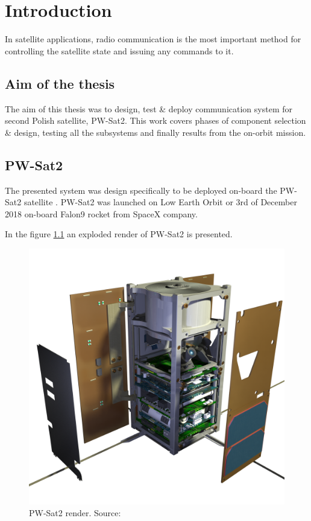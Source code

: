 \chapter{Introduction}
In satellite applications, radio communication is the most important method for controlling the satellite state and issuing any commands to it. 

\section{Aim of the thesis}
The aim of this thesis was to design, test \& deploy communication system for second Polish satellite, PW-Sat2. This work covers phases of component selection \& design, testing all the subsystems and finally results from the on-orbit mission.

\section{PW-Sat2}
    The presented system was design specifically to be deployed on-board the PW-Sat2 satellite \cite{PW-Sat2URL}. PW-Sat2 was launched on Low Earth Orbit or 3rd of December 2018 on-board Falon9 rocket from SpaceX company.

    In the figure \ref{PW-Sat_render_01} an exploded render of PW-Sat2 is presented.
    

    \begin{figure}[H]
        \centering
        \includegraphics[width=0.65\paperwidth]{img/1/PW-Sat2_render_01.png}
        \caption{PW-Sat2 render. Source: \cite{PW_sat2_photo}}
        \label{PW-Sat_render_01}
    \end{figure}


